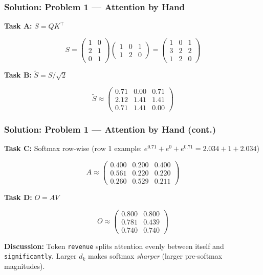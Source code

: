 \documentclass[9pt,t]{beamer}
\begin{document}
\begin{frame}
\frametitle{Solution: Problem 1 — Attention by Hand}

\textbf{Task A:} $S = QK^\top$

\[
S = \begin{pmatrix}1&0\\2&1\\0&1\end{pmatrix}
    \begin{pmatrix}1&0&1\\1&2&0\end{pmatrix}
  = \begin{pmatrix}1&0&1\\3&2&2\\1&2&0\end{pmatrix}
\]

\textbf{Task B:} $\tilde{S} = S/\sqrt{2}$

\[
\tilde{S} \approx \begin{pmatrix}0.71&0.00&0.71\\2.12&1.41&1.41\\0.71&1.41&0.00\end{pmatrix}
\]
\end{frame}

\begin{frame}
\frametitle{Solution: Problem 1 --- Attention by Hand (cont.)}

\textbf{Task C:} Softmax row-wise (row 1 example: $e^{0.71}+e^{0}+e^{0.71} = 2.034+1+2.034$)

\[
A \approx \begin{pmatrix}0.400&0.200&0.400\\0.561&0.220&0.220\\0.260&0.529&0.211\end{pmatrix}
\]

\textbf{Task D:} $O = AV$

\[
O \approx \begin{pmatrix}0.800&0.800\\0.781&0.439\\0.740&0.740\end{pmatrix}
\]

\textbf{Discussion:} Token \texttt{revenue} splits attention evenly between itself and
\texttt{significantly}. Larger $d_k$ makes softmax \emph{sharper} (larger pre-softmax magnitudes).
\end{frame}
\end{document}
